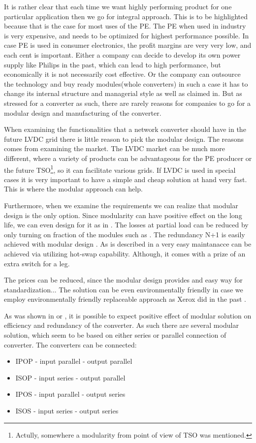\documentclass[]{scrartcl}
\begin{document}
It is rather clear that each time we want highly performing product for one particular application then we go for integral approach. This is to be highlighted because that is the case for most uses of the PE. The PE when used in industry is very expensive, and needs to be optimized for highest performance possible. In case PE is used in consumer electronics, the profit margins are very very low, and each cent is important. Either a company can decide to develop its own power supply like Philips in the past, which can lead to high performance, but economically it is not necessarily cost effective. Or the company can outsource the technology and buy ready modules(whole converters) in such a case it has to change its internal structure and managerial style as well as claimed in\cite{Fine2005}. But as stressed for a converter as such, there are rarely reasons for companies to go for a modular design and manufacturing of the converter. 


When examining the functionalities that a network converter should have in the future LVDC grid there is little reason to pick the modular design. The reasons comes from examining the market. The LVDC market can be much more different, where a variety of products can be advantageous for the PE producer or the future TSO\footnote{Actully, somewhere a modularity from point of view of TSO was mentioned.}, so it can facilitate various grids. If LVDC is used in special cases it is very important to have a simple and cheap solution at hand very fast. This is where the modular approach can help. 

Furthermore, when we examine the requirements we can realize that modular design is the only option. Since modularity can have positive effect on the long life, we can even design for it as in \cite{Newcomb1996}. The losses at partial load can be reduced by only turning on fraction of the modules such as \cite{Liserre2016a}. The redundancy N+1 is easily achieved with modular design \cite{Doncker2014}. As is described in \cite{Cottet2015} a very easy maintanacce can be achieved via utilizing hot-swap capability. Although, it comes with a prize of an extra switch for a leg. 

The prices can be reduced, since the modular design provides and easy way for standardization... The solution can be even environmentally friendly in case we employ environmentally friendly replaceable approach as Xerox did in the past \cite{Ulrich2004}.


%
 As was shown in \cite{Yang2014} or \cite{Quartarone}, it is possible to expect positive effect of modular solution on efficiency and redundancy of the converter. As such there are several modular solution, which seem to be based on either series or parallel connection of converter. The converters can be connected:
\begin{itemize}
	\item IPOP - input parallel - output parallel
	\item ISOP - input series - output parallel
	\item IPOS - input parallel - output series
	\item ISOS - input series - output series
\end{itemize}
\end{document}
